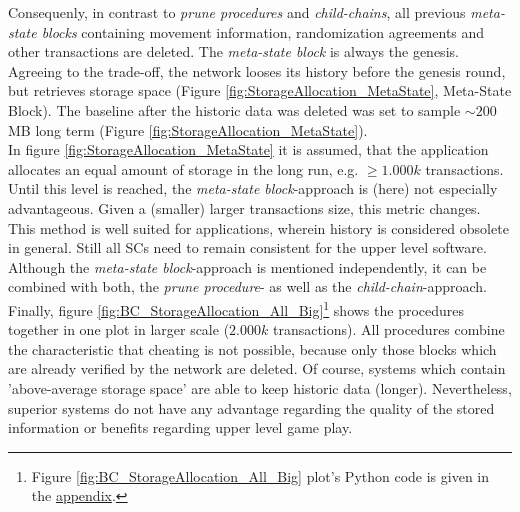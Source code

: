 \noindent Consequenly, in contrast to \textit{prune procedures} and \textit{child-chains}, all previous \textit{meta-state blocks}
containing movement information, randomization agreements and other transactions are deleted.
The \textit{meta-state block} is always the genesis.
Agreeing to the trade-off, the network looses its history before the genesis round, but retrieves storage space (Figure \ref{fig:StorageAllocation_MetaState}, Meta-State Block).
The baseline after the historic data was deleted was set to sample $\sim200$MB long term (Figure \ref{fig:StorageAllocation_MetaState}). \\
In figure \ref{fig:StorageAllocation_MetaState} it is assumed, that the application allocates an equal amount of storage in the long run, e.g. $\geq1.000k$ transactions.
Until this level is reached, the \textit{meta-state block}-approach is (here) not especially advantageous.
Given a (smaller) larger transactions size, this metric changes.
This method is well suited for applications, wherein history is considered obsolete in general.
Still all \gls{SC}s need to remain consistent for the upper level software.
Although the \textit{meta-state block}-approach is mentioned independently,
it can be combined with both, the \textit{prune procedure}- as well as the \textit{child-chain}-approach. \\
Finally, figure \ref{fig:BC_StorageAllocation_All_Big}\footnote{\hspace{0.1cm}Figure \ref{fig:BC_StorageAllocation_All_Big} plot's Python code is given in the \hyperref[script:StorageAllocationComp]{appendix}.}
shows the procedures together in one plot in larger scale ($2.000k$ transactions).
All procedures combine the characteristic that cheating is not possible, because only those blocks which are already verified by the network are deleted.
Of course, systems which contain 'above-average storage space' are able to keep historic data (longer).
Nevertheless, superior systems do not have any advantage regarding the quality of the stored information or benefits regarding upper level game play.



